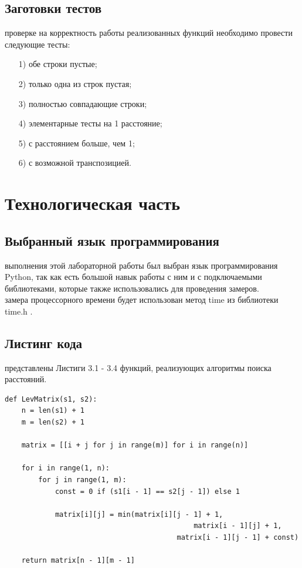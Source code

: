 \documentclass[12pt]{report}
\begin{document}
\section{Заготовки тестов}
 проверке на корректность работы реализованных функций необходимо провести следующие тесты:
\begin{enumerate}
	\item[1)]обе строки пустые;
	\item[2)]только одна из строк пустая;
	\item[3)]полностью совпадающие строки;
	\item[4)]элементарные тесты на 1 расстояние;
	\item[5)]с расстоянием больше, чем 1;
	\item[6)]с возможной транспозицией.
\end{enumerate}

\chapter{Технологическая часть}
\section{Выбранный язык программирования}
 выполнения этой лабораторной работы был выбран язык программирования Python, так как есть большой навык работы с ним и с подключаемыми библиотеками, которые также использовались для проведения замеров.\\

 замера процессорного времени будет использован метод time из библиотеки time.h \cite{python_site}.

\section{Листинг кода}
 представлены Листиги 3.1 - 3.4 функций, реализующих алгоритмы поиска расстояний.
\begin{lstlisting}[label=some-code, caption = Матричный алгоритм нахождения расстояния Левенштейна]
def LevMatrix(s1, s2):
	n = len(s1) + 1
	m = len(s2) + 1
	
	matrix = [[i + j for j in range(m)] for i in range(n)]
	
	for i in range(1, n):
		for j in range(1, m):
			const = 0 if (s1[i - 1] == s2[j - 1]) else 1
	
			matrix[i][j] = min(matrix[i][j - 1] + 1,
							   				 matrix[i - 1][j] + 1,
		 	  				   			 matrix[i - 1][j - 1] + const)
	
	return matrix[n - 1][m - 1]
	
	\end{lstlisting}
\end{document}
